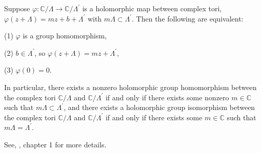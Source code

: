 \begin{corollary}\label{0.1.3.7}
 Suppose $\varphi: \mathbb{C} / \Lambda \longrightarrow \mathbb{C} / \Lambda^{\prime}$ is a holomorphic map between complex tori, $\varphi(z+\Lambda)=m z+b+\Lambda^{\prime}$ with $m \Lambda \subset \Lambda^{\prime}$. Then the following are equivalent:

(1) $\varphi$ is a group homomorphism,

(2) $b \in \Lambda^{\prime}$, so $\varphi(z+\Lambda)=m z+\Lambda^{\prime}$,

(3) $\varphi(0)=0$.

In particular, there exists a nonzero holomorphic group homomorphism between the complex tori $\mathbb{C} / \Lambda$ and $\mathbb{C} / \Lambda^{\prime}$ if and only if there exists some nonzero $m \in \mathbb{C}$ such that $m \Lambda \subset \Lambda^{\prime}$, and there exists a holomorphic group isomorphism between the complex tori $\mathbb{C} / \Lambda$ and $\mathbb{C} / \Lambda^{\prime}$ if and only if there exists some $m \in \mathbb{C}$ such that $m \Lambda=\Lambda^{\prime}$.
\end{corollary}
See, \cite{diamond2005first}, chapter 1 for more details. 

